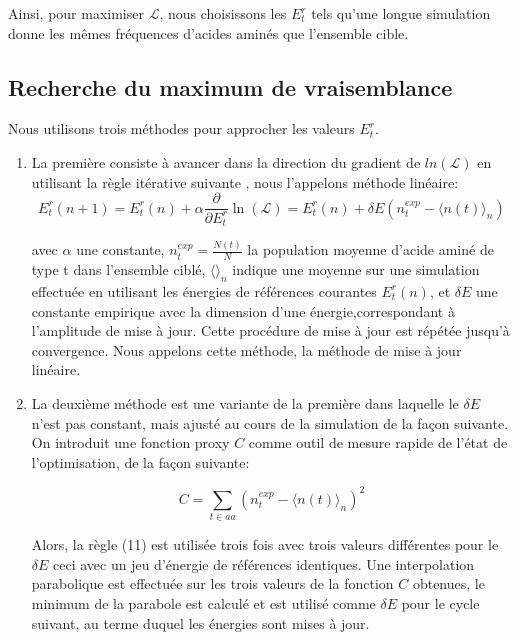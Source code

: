 Ainsi, pour maximiser $\mathcal{L}$, nous choisissons les ${E^r_t}$ tels qu'une longue simulation donne les mêmes fréquences d'acides aminés que l'ensemble cible.


\subsection{Recherche du maximum de vraisemblance}


Nous utilisons trois méthodes pour approcher les valeurs ${E^r_t}$.

\begin{enumerate}
  \label{enumMeth}
\item La première consiste à avancer dans la direction du gradient de $ln(\mathcal{L})$ en utilisant la règle itérative suivante \cite{Kleinman06}, nous l'appelons méthode linéaire:
\begin{equation} \label {eq: linear}
  E^r_t(n+1) = E^r_t(n) + \alpha \frac{\partial}{\partial E^r_t} \ln(\mathcal{L})=E^r_t(n) + \delta E (n^{exp}_t - \langle n(t)\rangle_n)
\end{equation} 

avec $\alpha$ une constante, $n^{exp}_t = \frac{N(t)}{N}$ la population moyenne d'acide aminé de type t dans l'ensemble ciblé,
$\langle\rangle_n$ indique une moyenne sur une simulation effectuée en utilisant les énergies de références courantes ${E^r_t(n)}$, et $\delta E$ une constante empirique avec la dimension d'une énergie,correspondant à l'amplitude de mise à jour. Cette procédure de mise à jour est répétée jusqu'à convergence. Nous appelons cette méthode, la méthode de mise à jour linéaire.

\item La deuxième méthode est une variante de la première dans laquelle le $\delta E$ n'est pas constant, mais ajusté au cours de la simulation de la façon suivante. On introduit une fonction proxy $C$ comme outil de mesure rapide de l'état de l'optimisation, de la façon suivante:

\begin{equation} \label {eq:proxy_function}
C =\sum_{t \in aa}(n^{exp}_t - \langle n(t)\rangle_n )^2
\end{equation} 

  Alors, la règle (11) est utilisée trois fois avec trois valeurs différentes pour le $\delta E$ ceci avec un jeu d'énergie de références identiques. Une interpolation parabolique est effectuée sur les trois valeurs de la fonction $C$ obtenues, le minimum de la parabole est calculé et est utilisé comme $\delta E$ pour le cycle suivant, au terme duquel les énergies sont mises à jour.


\end{enumerate}
